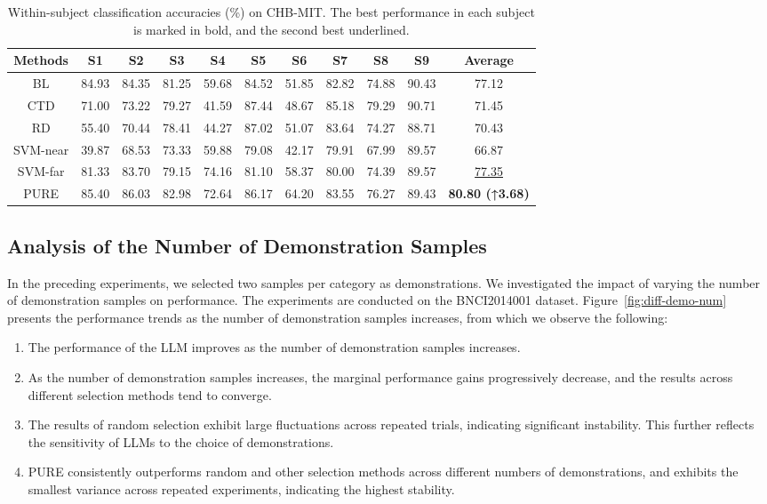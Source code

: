 \documentclass[journal,twocolumn]{IEEEtran}
\begin{document}
\begin{table}[htpb] \centering
  \caption{Within-subject classification accuracies (\%) on CHB-MIT. The best performance in each subject is marked in bold, and the second best underlined.}
  \label{tab:chb-mit-result}
  \begin{tabular}{c|c|c|c|c|c|c|c|c|c|c}
  \toprule
  Methods & S1 & S2 & S3 & S4 & S5 & S6 & S7 & S8 & S9 & Average \\
  \midrule
  BL & 84.93 & 84.35 & 81.25 & 59.68 & 84.52 & 51.85 & 82.82 & 74.88 & 90.43 & 77.12 \\
  CTD & 71.00 & 73.22 & 79.27 & 41.59 & 87.44 & 48.67 & 85.18 & 79.29 & 90.71 & 71.45 \\
  RD & 55.40 & 70.44 & 78.41 & 44.27 & 87.02 & 51.07 & 83.64 & 74.27 & 88.71 & 70.43 \\
  SVM-near & 39.87 & 68.53 & 73.33 & 59.88 & 79.08 & 42.17 & 79.91 & 67.99 & 89.57 & 66.87 \\
  SVM-far & 81.33 & 83.70 & 79.15 & 74.16 & 81.10 & 58.37 & 80.00 & 74.39 & 89.57 & \underline{77.35} \\
  PURE & 85.40 & 86.03 & 82.98 & 72.64 & 86.17 & 64.20 & 83.55 & 76.27 & 89.43 & \textbf{80.80 (↑3.68)} \\
  \bottomrule
  \end{tabular}
\end{table}

\subsection{Analysis of the Number of Demonstration Samples}
In the preceding experiments, we selected two samples per category as demonstrations. We investigated the impact of varying the number of demonstration samples on performance. The experiments are conducted on the BNCI2014001 dataset. Figure~\ref{fig:diff-demo-num} presents the performance trends as the number of demonstration samples increases, from which we observe the following:

\begin{enumerate}
  \item The performance of the LLM improves as the number of demonstration samples increases.
  \item As the number of demonstration samples increases, the marginal performance gains progressively decrease, and the results across different selection methods tend to converge.
  \item The results of random selection exhibit large fluctuations across repeated trials, indicating significant instability. This further reflects the sensitivity of LLMs to the choice of demonstrations.
  \item PURE consistently outperforms random and other selection methods across different numbers of demonstrations, and exhibits the smallest variance across repeated experiments, indicating the highest stability.
\end{enumerate}
\end{document}
